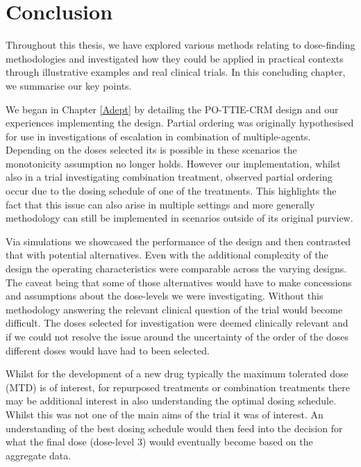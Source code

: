 
\chapter{Conclusion} %

\label{Conclusion} %

Throughout this thesis, we have explored various methods relating to dose-finding methodologies and investigated how they could be applied in practical contexts through illustrative examples and real clinical trials. In this concluding chapter, we summarise our key points. 

We began in Chapter \ref{Adept} by detailing the PO-TTIE-CRM design \cite{wagesContinualReassessmentMethod2011, wagesUsingTimetoeventContinual2013} and our experiences implementing the design. Partial ordering was originally hypothesised for use in investigations of escalation in combination of multiple-agents. Depending on the doses selected its is possible in these scenarios the monotonicity assumption no longer holds. However our implementation, whilst also in a trial investigating combination treatment, observed partial ordering occur due to the dosing schedule of one of the treatments. This highlights the fact that this issue can also arise in multiple settings and more generally methodology can still be implemented in scenarios outside of its original purview.  

Via simulations we showcased the performance of the design and then contrasted that with potential alternatives. Even with the additional complexity of the design the operating characteristics were comparable across the varying designs. The caveat being that some of those alternatives would have to make concessions and assumptions about the dose-levels we were investigating. Without this methodology answering the relevant clinical question of the trial would become difficult. The doses selected for investigation were deemed clinically relevant and if we could not resolve the issue around the uncertainty of the order of the doses different doses would have had to been selected. 

Whilst for the development of a new drug typically the maximum tolerated dose (MTD) is of interest, for repurposed treatments or combination treatments there may be additional interest in also understanding the optimal dosing schedule. Whilst this was not one of the main aims of the trial it was of interest. An understanding of the best dosing schedule would then feed into the decision for what the final dose (dose-level 3) would eventually become based on the aggregate data. 

